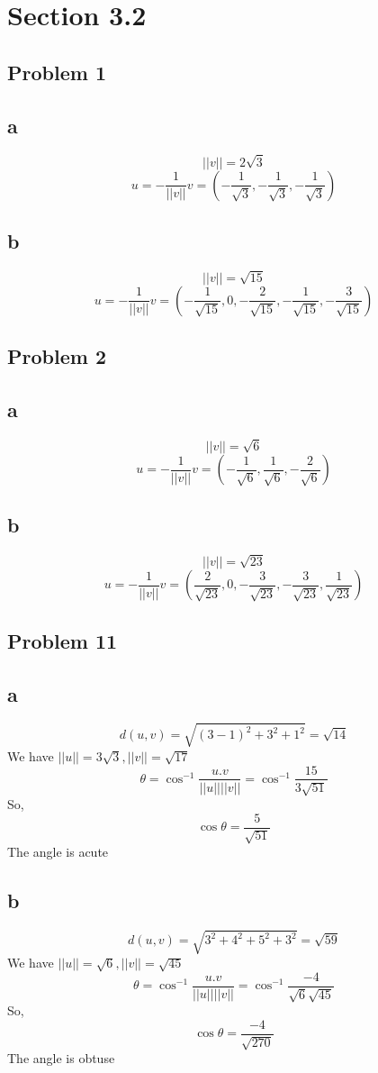 \documentclass[a4paper,12pt]{report}
\begin{document}
\section*{Section 3.2}
\subsection*{Problem 1}
\subsection*{a}
\[||v||=2\sqrt{3}\]
\[u=-\frac{1}{||v||}v=(-\frac{1}{\sqrt{3}},-\frac{1}{\sqrt{3}},-\frac{1}{\sqrt{3}})\]

\subsection*{b}
\[||v||=\sqrt{15}\]
\[u=-\frac{1}{||v||}v=(-\frac{1}{\sqrt{15}},0,-\frac{2}{\sqrt{15}},-\frac{1}{\sqrt{15}},-\frac{3}{\sqrt{15}})\]

\subsection*{Problem 2}
\subsection*{a}
\[||v||=\sqrt{6}\]
\[u=-\frac{1}{||v||}v=(-\frac{1}{\sqrt{6}},\frac{1}{\sqrt{6}},-\frac{2}{\sqrt{6}})\]

\subsection*{b}
\[||v||=\sqrt{23}\]
\[u=-\frac{1}{||v||}v=(\frac{2}{\sqrt{23}},0,-\frac{3}{\sqrt{23}},-\frac{3}{\sqrt{23}},\frac{1}{\sqrt{23}})\]

\subsection*{Problem 11}
\subsection*{a}
\[d(u,v)=\sqrt{(3-1)^2+3^2+1^2}=\sqrt{14}\]
We have \(||u||=3\sqrt{3},||v||=\sqrt{17}\)
\[\theta=\cos^{-1}{\frac{u.v}{||u||||v||}}=\cos^{-1}{\frac{15}{3\sqrt{51}}}\]
So,
\[\cos\theta=\frac{5}{\sqrt{51}}\]
The angle is acute

\subsection*{b}
\[d(u,v)=\sqrt{3^2+4^2+5^2+3^2}=\sqrt{59}\]
We have \(||u||=\sqrt{6},||v||=\sqrt{45}\)
\[\theta=\cos^{-1}{\frac{u.v}{||u||||v||}}=\cos^{-1}{\frac{-4}{\sqrt{6}\sqrt{45}}}\]
So,
\[\cos\theta=\frac{-4}{\sqrt{270}}\]
The angle is obtuse
\end{document}

